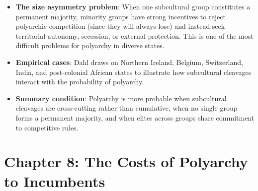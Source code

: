 \documentclass[12pt]{article}
\begin{document}
\begin{itemize}[leftmargin=*, itemsep=4pt]
    \item \textbf{The size asymmetry problem}: When one subcultural group constitutes a permanent majority, minority groups have strong incentives to reject polyarchic competition (since they will always lose) and instead seek territorial autonomy, secession, or external protection. This is one of the most difficult problems for polyarchy in diverse states.
    \item \textbf{Empirical cases}: Dahl draws on Northern Ireland, Belgium, Switzerland, India, and post-colonial African states to illustrate how subcultural cleavages interact with the probability of polyarchy.
    \item \textbf{Summary condition}: Polyarchy is more probable when subcultural cleavages are cross-cutting rather than cumulative, when no single group forms a permanent majority, and when elites across groups share commitment to competitive rules.
\end{itemize}

\section{Chapter 8: The Costs of Polyarchy to Incumbents}
\end{document}
